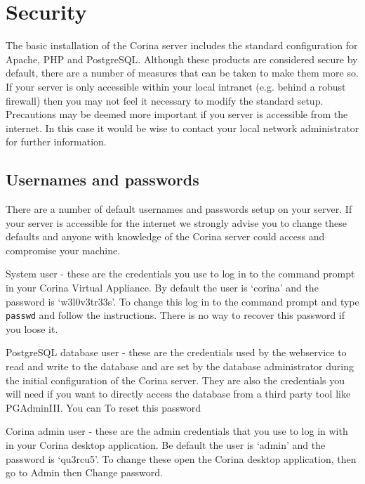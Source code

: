 \section{Security}
The basic installation of the Corina server includes the standard configuration for Apache, PHP and PostgreSQL.  Although these products are considered secure by default, there are a number of measures that can be taken to make them more so.  If your server is only accessible within your local intranet (e.g. behind a robust firewall) then you may not feel it necessary to modify the standard setup.  Precautions may be deemed more important if you server is accessible from the internet.  In this case it would be wise to contact your local network administrator for further information.

\subsection{Usernames and passwords}
\label{txt:passwords}
There are a number of default usernames and passwords setup on your server.  If your server is accessible for the internet we strongly advise you to change these defaults and anyone with knowledge of the Corina server could access and compromise your machine.

\begin{description*}
 \item[System user] - these are the credentials you use to log in to the command prompt in your Corina Virtual Appliance.  By default the user is `corina' and the password is `w3l0v3tr33s'.  To change this log in to the command prompt and type \verb|passwd| and follow the instructions.  There is no way to recover this password if you loose it.
 \item[PostgreSQL database user] - these are the credentials used by the webservice to read and write to the database and are set by the database administrator during the initial configuration of the Corina server. They are also the credentials you will need if you want to directly access the database from a third party tool like PGAdminIII.  You can To reset this password 
 \item[Corina admin user] - these are the admin credentials that you use to log in with in your Corina desktop application.  Be default the user is `admin' and the password is `qu3rcu5'.  To change these open the Corina desktop application, then go to Admin then Change password.
\end{description*}


